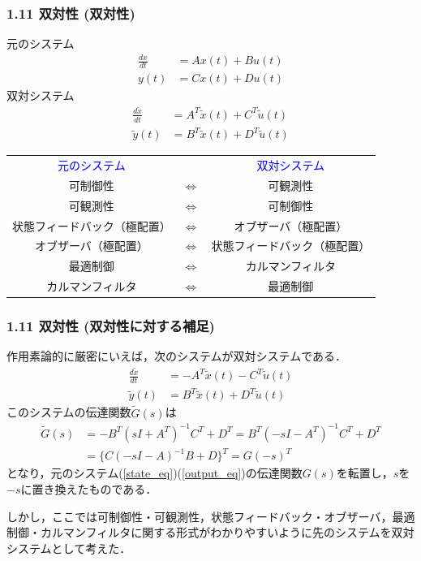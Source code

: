 \documentclass[10pt]{beamer}
\begin{document}
\begin{frame}[t]
\frametitle{1.11 双対性 (双対性)}
元のシステム
\begin{align}
 \frac{dx}{dt} &= A x(t) + B u(t)  \\
 y(t) &= C x(t) + D u(t) 
\end{align}
双対システム
\begin{align}
 \frac{d \tilde{x}}{dt} &= A^T \tilde{x}(t) + C^T \tilde{u}(t)  \\
 \tilde{y}(t) &= B^T \tilde{x}(t) + D^T \tilde{u}(t) 
\end{align}
\begin{center}
\begin{tabular}{ccc}
  \textcolor{blue}{元のシステム}        &         & \textcolor{blue}{双対システム}  \\
  可制御性          & $\Leftrightarrow$ & 可観測性 \\
  可観測性          & $\Leftrightarrow$ & 可制御性 \\
  状態フィードバック（極配置）& $\Leftrightarrow$ & オブザーバ（極配置） \\
  オブザーバ（極配置）    & $\Leftrightarrow$ & 状態フィードバック（極配置） \\
  最適制御          & $\Leftrightarrow$ & カルマンフィルタ \\
  カルマンフィルタ      & $\Leftrightarrow$ & 最適制御 \\
\end{tabular}
\end{center}
\end{frame}


\begin{frame}[t]
\frametitle{1.11 双対性 (双対性に対する補足)}
作用素論的に厳密にいえば，次のシステムが双対システムである．
\begin{align}
 \frac{d \tilde{x}}{dt} &= -A^T \tilde{x}(t) - C^T \tilde{u}(t)  \\
 \tilde{y}(t) &= B^T \tilde{x}(t) + D^T \tilde{u}(t) 
\end{align}
このシステムの伝達関数$\tilde{G}(s)$は
\begin{align}
  \tilde{G}(s) &= - B^T (sI+A^T)^{-1} C^T + D^T=  B^T (-sI-A^T)^{-1} C^T + D^T
\nonumber \\
  &= \{C(-sI-A)^{-1}B + D\}^T = G(-s)^T
\end{align}
となり，元のシステム(\ref{state_eq})(\ref{output_eq})の伝達関数$G(s)$を転置し，$s$を$-s$に置き換えたものである．

しかし，ここでは可制御性・可観測性，状態フィードバック・オブザーバ，最適制御・カルマンフィルタに関する形式がわかりやすいように先のシステムを双対システムとして考えた．
\end{frame}



\end{document}
